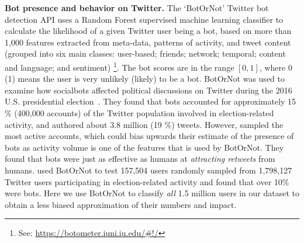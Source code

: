 \textbf{Bot presence and behavior on Twitter.}
\label{previousworkbots}
%
The `BotOrNot' Twitter bot detection API uses a Random Forest supervised machine learning classifier to calculate the likelihood of a given Twitter user being a bot, based on more than 1,000 features extracted from meta-data, patterns of activity, and tweet content (grouped into six main classes: user-based; friends; network; temporal; content and language; and sentiment) 
\cite{davisetal.16,varol.17}\footnote{See: \url{https://botometer.iuni.iu.edu/\#!/}}.
The bot scores are in the range $[0,1]$, where 0 (1) means the user is very unlikely (likely) to be a bot. 
BotOrNot was used to examine how socialbots affected political discussions on Twitter during the 2016 U.S. presidential election~\cite{FM7090}.
They found that bots accounted for approximately 15 \% (400,000 accounts) of the Twitter population involved in election-related activity, and authored about 3.8 million (19 \%) tweets. 
However, \citet{FM7090} sampled the most active accounts, which could bias upwards their estimate of the presence of bots as activity volume is one of the features that is used by BotOrNot. 
They found that bots were just as effective as humans at \textit{attracting retweets} from humans. 
\citet{Woolley.2017} used BotOrNot to test 157,504 users randomly sampled from 1,798,127 Twitter users participating in election-related activity 
and found that over 10\% were bots. 
Here we use BotOrNot to classify \textit{all} 1.5 million users in our dataset to obtain a less biased approximation of their numbers and impact.

